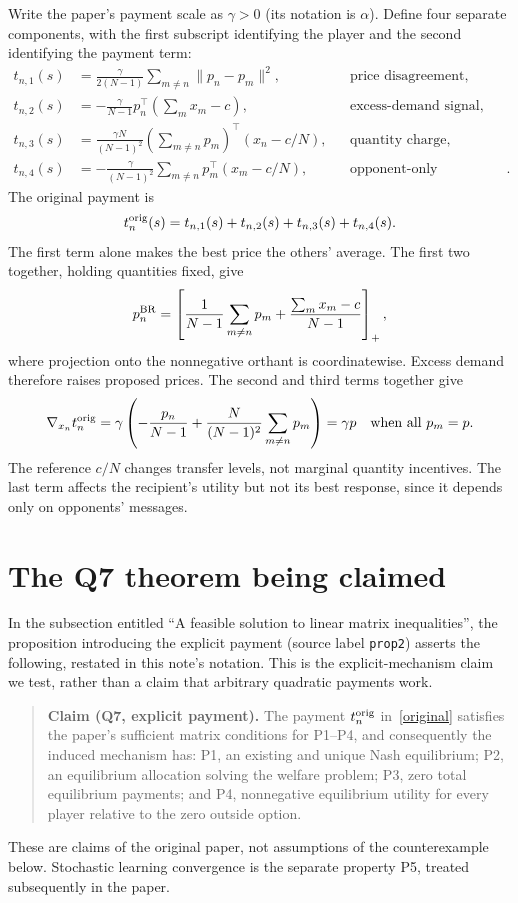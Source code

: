 \documentclass[11pt]{article}
\begin{document}
Write the paper's payment scale as $\gamma>0$ (its notation is
$\alpha$). Define four separate components, with the first subscript
identifying the player and the second identifying the payment term:
\begin{align}
 t_{n,1}(s)&=\frac{\gamma}{2(N-1)}
 \sum_{m\ne n}\|p_n-p_m\|^2,
 &&\text{price disagreement},\label{term1}\\
 t_{n,2}(s)&=-\frac{\gamma}{N-1}p_n^\top
 \left(\sum_mx_m-c\right),
 &&\text{excess-demand signal},\label{term2}\\
 t_{n,3}(s)&=\frac{\gamma N}{(N-1)^2}
 \left(\sum_{m\ne n}p_m\right)^\top(x_n-c/N),
 &&\text{quantity charge},\label{term3}\\
 t_{n,4}(s)&=-\frac{\gamma}{(N-1)^2}
 \sum_{m\ne n}p_m^\top(x_m-c/N),
 &&\text{opponent-only adjustment}.\label{term4}
\end{align}
The original payment is
\begin{equation}\label{original}
 t_n^{\rm orig}(s)=t_{n,1}(s)+t_{n,2}(s)+t_{n,3}(s)+t_{n,4}(s).
\end{equation}
The first term alone makes the best price the others' average.
The first two together, holding quantities fixed, give
\[
 p_n^{\rm BR}=\left[
 \frac1{N-1}\sum_{m\ne n}p_m+
 \frac{\sum_mx_m-c}{N-1}\right]_+,
\]
where projection onto the nonnegative orthant is coordinatewise.
Excess demand therefore raises proposed prices. The second and third
terms together give
\[
 \nabla_{x_n}t_n^{\rm orig}
 =\gamma\left(-\frac{p_n}{N-1}
 +\frac{N}{(N-1)^2}\sum_{m\ne n}p_m\right)
 =\gamma p\quad\text{when all }p_m=p.
\]
The reference $c/N$ changes transfer levels, not marginal quantity
incentives. The last term affects the recipient's utility but not its
best response, since it depends only on opponents' messages.

\section{The Q7 theorem being claimed}
In the subsection entitled ``A feasible solution to linear matrix
inequalities'', the proposition introducing the explicit payment
(source label \texttt{prop2}) asserts the following, restated in this
note's notation. This is the explicit-mechanism claim we test, rather
than a claim that arbitrary quadratic payments work.
\begin{quote}
\textbf{Claim (Q7, explicit payment).}
The payment $t_n^{\rm orig}$ in~\eqref{original} satisfies the paper's
sufficient matrix conditions for P1--P4, and consequently the induced
mechanism has: P1, an existing and unique Nash equilibrium; P2, an
equilibrium allocation solving the welfare problem; P3, zero total
equilibrium payments; and P4, nonnegative equilibrium utility for every
player relative to the zero outside option.
\end{quote}
These are claims of the original paper, not assumptions of the
counterexample below. Stochastic learning convergence is the separate
property P5, treated subsequently in the paper.
\end{document}

